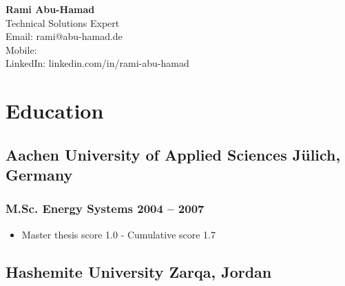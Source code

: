 \documentclass[11pt]{article} %
\begin{document}
	\sloppy	
	\setlength{\parskip}{1pt}
	\noindent
	\begin{minipage}[c]{0.18\textwidth}
	\end{minipage}
	\hspace{1.5em} %
	\begin{minipage}[c]{0.78\textwidth} %
		\raggedright
		{\namefont\Huge\bfseries Rami Abu-Hamad}\\[0.5ex] %
		Technical Solutions Expert \\[2ex] %
		
		Email: rami@abu-hamad.de \\
		Mobile: \\
		LinkedIn: linkedin.com/in/rami-abu-hamad 
	\end{minipage}
	
	\vspace{2ex} %
	
	\section{Education}
	\vspace{-1.5ex}
	\subsection{Aachen University of Applied Sciences \hfill Jülich, Germany}
	\subsubsection{M.Sc. Energy Systems \hfill 2004 – 2007}
	\begin{itemize}[itemsep=4pt, topsep=2pt, left=1em]
		\item Master thesis score 1.0 - Cumulative score 1.7
	\end{itemize}
	
	\subsection{Hashemite University \hfill Zarqa, Jordan}
\end{document}
